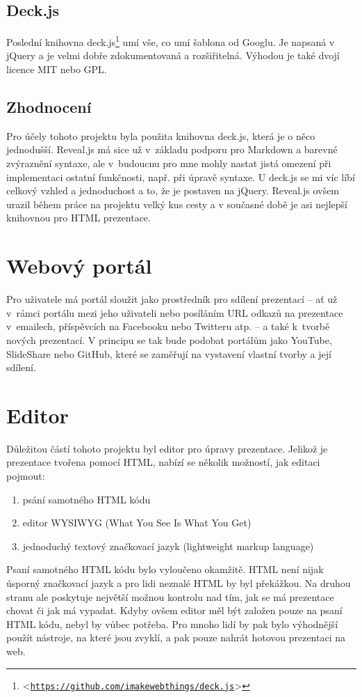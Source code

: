\documentclass[11pt,twoside,a4paper]{book}
\let\oldUrl\url									%
\renewcommand\url[1]{<\texttt{\oldUrl{#1}}>}
\begin{document}
\subsection{Deck.js}
Poslední knihovna deck.js\footnote{\url{https://github.com/imakewebthings/deck.js}} umí vše, co umí šablona od Googlu. Je napsaná v jQuery a je velmi dobře zdokumentovaná a rozšiřitelná. Výhodou je také dvojí licence MIT nebo GPL.

\subsection{Zhodnocení}
Pro účely tohoto projektu byla použita knihovna deck.js, která je o něco jednodušší. Reveal.js má sice už v~základu podporu pro Markdown a barevné zvýraznění syntaxe, ale v~budoucnu pro mne mohly nastat jistá omezení při implementaci ostatní funkčnosti, např. při úpravě syntaxe. U deck.js se mi víc líbí celkový vzhled a jednoduchost a to, že je postaven na jQuery. Reveal.js ovšem urazil během práce na projektu velký kus cesty a v současné době je asi nejlepší knihovnou pro HTML prezentace.


\section{Webový portál}
Pro uživatele má portál sloužit jako prostředník pro sdílení prezentací – ať už v~rámci portálu mezi jeho uživateli nebo
posíláním URL odkazů na prezentace v~emailech, příspěvcích na Facebooku nebo Twitteru atp. – a také k~tvorbě nových
prezentací. V principu se tak bude podobat portálům jako YouTube, SlideShare nebo GitHub, které se zaměřují na vystavení vlastní tvorby a její sdílení.

\section{Editor}
Důležitou částí tohoto projektu byl editor pro úpravy prezentace. Jelikož je prezentace tvořena pomocí HTML, nabízí se
několik možností, jak editaci pojmout:

\begin{enumerate}
	\item psání samotného HTML kódu
	\item editor WYSIWYG (What You See Is What You Get)
	\item jednoduchý textový značkovací jazyk (lightweight markup language)
\end{enumerate}

Psaní samotného HTML kódu bylo vyloučeno okamžitě. HTML není nijak úsporný značkovací jazyk a pro lidi neznalé HTML by
byl překážkou. Na druhou stranu ale poskytuje největší možnou kontrolu nad tím, jak se má prezentace chovat či jak má
vypadat. Kdyby ovšem editor měl být založen pouze na psaní HTML kódu, nebyl by vůbec potřeba. Pro mnoho lidí by pak bylo
výhodnější použít nástroje, na které jsou zvyklí, a pak pouze nahrát hotovou prezentaci na web.
\end{document}
